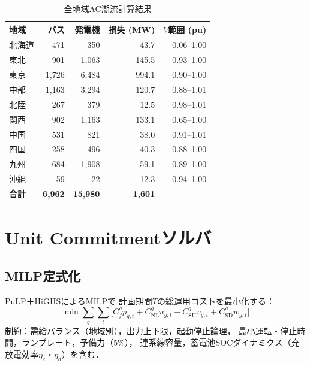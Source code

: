 \documentclass[fleqn]{ieej}
\begin{document}
\begin{table}[t]
  \caption{全地域AC潮流計算結果}
  \label{tab:pf}
  \centering\small
  \begin{tabular}{lrrrr}
    \toprule
    地域 & バス & 発電機 & 損失 (MW) & $V$範囲 (pu) \\
    \midrule
    北海道 &   471 &    350 &    43.7 & 0.06--1.00 \\
    東北   &   901 &  1,063 &   145.5 & 0.93--1.00 \\
    東京   & 1,726 &  6,484 &   994.1 & 0.90--1.00 \\
    中部   & 1,163 &  3,294 &   120.7 & 0.88--1.01 \\
    北陸   &   267 &    379 &    12.5 & 0.98--1.01 \\
    関西   &   902 &  1,163 &   133.1 & 0.65--1.00 \\
    中国   &   531 &    821 &    38.0 & 0.91--1.01 \\
    四国   &   258 &    496 &    40.3 & 0.88--1.00 \\
    九州   &   684 &  1,908 &    59.1 & 0.89--1.00 \\
    沖縄   &    59 &     22 &    12.3 & 0.94--1.00 \\
    \midrule
    \textbf{合計} & \textbf{6,962} & \textbf{15,980} & \textbf{1,601} & --- \\
    \bottomrule
  \end{tabular}
\end{table}

\section{Unit Commitmentソルバ}

\subsection{MILP定式化}

PuLP\cite{pulp}＋HiGHS\cite{highs}によるMILPで
計画期間$T$の総運用コストを最小化する：
\begin{equation}
  \min\sum_{g}\sum_{t}\bigl[
    C_f^g p_{g,t}+C_{\mathrm{NL}}^g u_{g,t}
    +C_{\mathrm{SU}}^g v_{g,t}+C_{\mathrm{SD}}^g w_{g,t}
  \bigr]
  \label{eq:uc}
\end{equation}
制約：需給バランス（地域別），出力上下限，起動停止論理，
最小運転・停止時間，ランプレート，予備力（5\%），
連系線容量，蓄電池SOCダイナミクス（充放電効率$\eta_c$・$\eta_d$）を含む．
\end{document}
